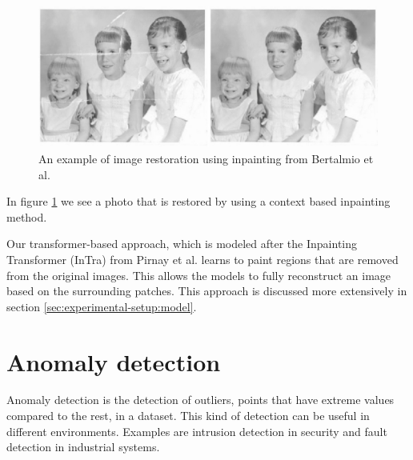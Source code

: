 \begin{figure}[ht!]
\centering
\includegraphics[width=\textwidth]{imgs/inpainting-example.jpeg}
\caption{An example of image restoration using inpainting from Bertalmio et al. \cite{bertalmio_image_2000}}
\label{fig:prelim:inpainting-example}
\end{figure}

In figure \ref{fig:prelim:inpainting-example} we see a photo that is restored by using a context based inpainting method.

Our transformer-based approach, which is modeled after the Inpainting Transformer (InTra) from Pirnay et al. \cite{pirnay_inpainting_2021} learns to paint regions that are removed from the original images. This allows the models to fully reconstruct an image based on the surrounding patches. This approach is discussed more extensively in section \ref{sec:experimental-setup:model}.

\section{Anomaly detection}
\label{sec:prelim:anomaly-detection}

Anomaly detection is the detection of outliers, points that have extreme values compared to the rest, in a dataset.
This kind of detection can be useful in different environments. Examples are intrusion detection in security and fault detection in industrial systems.


